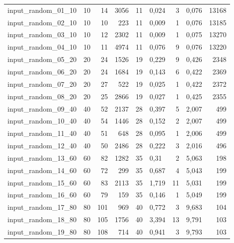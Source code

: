 \begin{landscape}
\begin{longtable}{|l|r|r|r|r|l|r|l|r|}
    input\_random\_01\_10  & 10    & 14    & 3056  & 11    & 0,024  & 3     & 0,076     & 13168   \\
    input\_random\_02\_10  & 10    & 10    & 223   & 11    & 0,009  & 1     & 0,076     & 13185   \\
    input\_random\_03\_10  & 10    & 12    & 2302  & 11    & 0,009  & 1     & 0,075     & 13270   \\
    input\_random\_04\_10  & 10    & 11    & 4974  & 11    & 0,076  & 9     & 0,076     & 13220   \\
    input\_random\_05\_20  & 20    & 24    & 1526  & 19    & 0,229  & 9     & 0,426     & 2348   \\
    input\_random\_06\_20  & 20    & 24    & 1684  & 19    & 0,143  & 6     & 0,422     & 2369   \\
    input\_random\_07\_20  & 20    & 27    & 522   & 19    & 0,025  & 1     & 0,422     & 2372   \\
    input\_random\_08\_20  & 20    & 25    & 2866  & 19    & 0,027  & 1     & 0,425     & 2355   \\
    input\_random\_09\_40  & 40    & 52    & 2137  & 28    & 0,397  & 5     & 2,007     & 499   \\
    input\_random\_10\_40  & 40    & 54    & 1446  & 28    & 0,152  & 2     & 2,007     & 499   \\
    input\_random\_11\_40  & 40    & 51    & 648   & 28    & 0,095  & 1     & 2,006     & 499   \\
    input\_random\_12\_40  & 40    & 50    & 2486  & 28    & 0,222  & 3     & 2,016     & 496   \\
    input\_random\_13\_60  & 60    & 82    & 1282  & 35    & 0,31   & 2     & 5,063     & 198   \\
    input\_random\_14\_60  & 60    & 72    & 299   & 35    & 0,687  & 4     & 5,043     & 199   \\
    input\_random\_15\_60  & 60    & 83    & 2113  & 35    & 1,719  & 11    & 5,031     & 199   \\
    input\_random\_16\_60  & 60    & 79    & 159   & 35    & 0,146  & 1     & 5,049     & 199   \\
    input\_random\_17\_80  & 80    & 101   & 969   & 40    & 0,772  & 3     & 9,683     & 104   \\
    input\_random\_18\_80  & 80    & 105   & 1756  & 40    & 3,394  & 13    & 9,791     & 103   \\
    input\_random\_19\_80  & 80    & 108   & 714   & 40    & 0,941  & 3     & 9,793     & 103   \\

\end{longtable}
\end{landscape}
